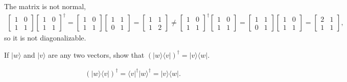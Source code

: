 \documentclass[en]{sol-man}
\begin{document}
\begin{pf}
    The matrix is not normal,
    \begin{align}
        \left[\begin{matrix}
            1&0\\
            1&1
        \end{matrix}\right]\left[\begin{matrix}
            1&0\\
            1&1
        \end{matrix}\right]^{\dagger}=\left[\begin{matrix}
            1&0\\
            1&1
        \end{matrix}\right]\left[\begin{matrix}
            1&1\\
            0&1
        \end{matrix}\right]=\left[\begin{matrix}
            1&1\\
            1&2
        \end{matrix}\right]\neq\left[\begin{matrix}
            1&0\\
            1&1
        \end{matrix}\right]^{\dagger}\left[\begin{matrix}
            1&0\\
            1&1
        \end{matrix}\right]=\left[\begin{matrix}
            1&1\\
            0&1
        \end{matrix}\right]\left[\begin{matrix}
            1&0\\
            1&1
        \end{matrix}\right]=\left[\begin{matrix}
            2&1\\
            1&1
        \end{matrix}\right],
    \end{align}
    so it is not diagonalizable.
\end{pf}

\begin{exe}
    If $\lvert w\rangle$ and $\lvert v\rangle$ are any two vectors, show that $(\lvert w\rangle\langle v\rvert)^{\dagger}=\lvert v\rangle\langle w\rvert$.
\end{exe}
\begin{pf}
    \begin{align}
        (\lvert w\rangle\langle v\rvert)^{\dagger}=\langle v\rvert^{\dagger}\lvert w\rangle^{\dagger}=\lvert v\rangle\langle w\rvert.
    \end{align}
\end{pf}
\end{document}
